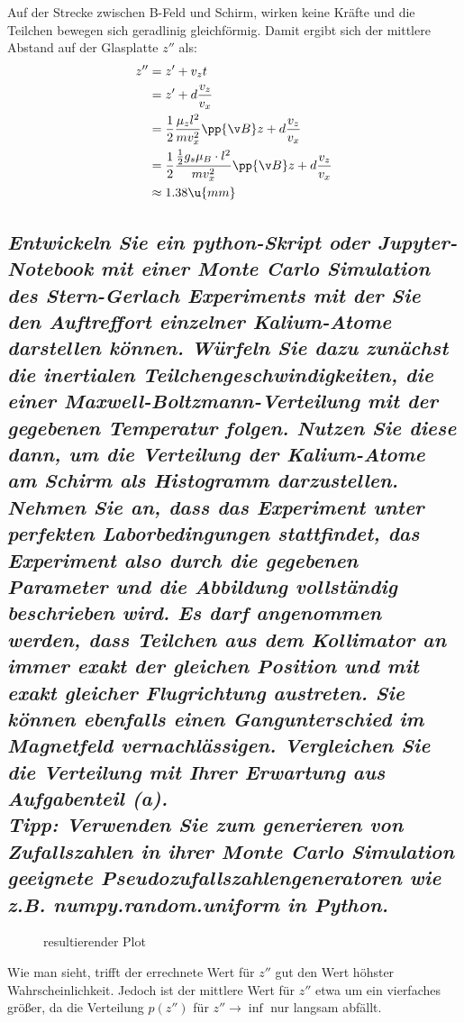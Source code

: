 \documentclass[ex, minted]{exercise_4.0}
\begin{document}
Auf der Strecke zwischen B-Feld und Schirm, wirken keine Kräfte und die Teilchen bewegen sich geradlinig gleichförmig. Damit ergibt sich der mittlere Abstand auf der Glasplatte \(z''\) als:
\begin{align*}
    z'' &= z' + v_z t\\
    &= z' + d \frac{v_z }{v_x}\\
    &= \frac 12 \frac{\mu_z l^2}{m v_x^2} \pp{\v B}z + d \frac{v_z }{v_x}\\
    &= \frac 12 \frac{\frac12 g_s \mu_B \cdot l^2}{m v_x^2} \pp{\v B}z + d \frac{v_z }{v_x}\\
    &\approx 1.38\u{mm}
\end{align*}


\subsection
{\it Entwickeln Sie ein python-Skript oder Jupyter-Notebook mit einer Monte Carlo Simulation des Stern-Gerlach Experiments mit der Sie den Auftreffort einzelner Kalium-Atome darstellen können. Würfeln
Sie dazu zunächst die inertialen Teilchengeschwindigkeiten, die einer Maxwell-Boltzmann-Verteilung mit
der gegebenen Temperatur folgen.
Nutzen Sie diese dann, um die Verteilung der Kalium-Atome am Schirm als Histogramm darzustellen.
Nehmen Sie an, dass das Experiment unter perfekten Laborbedingungen stattfindet, das Experiment also
durch die gegebenen Parameter und die Abbildung vollständig beschrieben wird. Es darf angenommen
werden, dass Teilchen aus dem Kollimator an immer exakt der gleichen Position und mit exakt gleicher
Flugrichtung austreten. Sie können ebenfalls einen Gangunterschied im Magnetfeld vernachlässigen.
Vergleichen Sie die Verteilung mit Ihrer Erwartung aus Aufgabenteil (a).\\
Tipp: Verwenden Sie zum generieren von Zufallszahlen in ihrer Monte Carlo Simulation geeignete Pseudozufallszahlengeneratoren wie z.B. numpy.random.uniform in Python.}

\dottedlinett


\begin{figure}[H]
    \centering
    
    \caption{resultierender Plot}
\end{figure}

Wie man sieht, trifft der errechnete Wert für \(z''\) gut den Wert höhster Wahrscheinlichkeit. Jedoch ist der mittlere Wert für \(z''\) etwa um ein vierfaches größer, da die Verteilung \(p(z'')\) für \(z''\to\inf\) nur langsam abfällt. 
\end{document}
